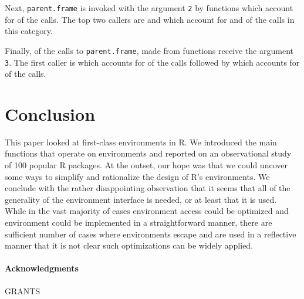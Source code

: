 \documentclass[10pt,review,sigplan,authorversion=true]{acmart}
\renewcommand{\c}[1]{\lstinline |#1|\xspace}
\begin{document}
Next, \c{parent.frame} is invoked with the argument \c{2} by
\ParentFrameDepthTwoFunCnt functions which account for
\ParentFrameDepthTwoCallPerc of the calls. The top two callers are
\ParentFrameDepthTwoCallerOneCallerName and
\ParentFrameDepthTwoCallerTwoCallerName which account for
\ParentFrameDepthTwoCallerOneCallPerc and \ParentFrameDepthTwoCallerTwoCallPerc
of the calls in this category.

Finally, \ParentFrameDepthThreeCallPerc of the calls to \c{parent.frame}, made
from \ParentFrameDepthThreeFunCnt functions receive the argument \c{3}. The
first caller is \ParentFrameDepthThreeCallerOneCallerName which accounts for
\ParentFrameDepthThreeCallerOneCallPerc of the calls followed by
\ParentFrameDepthThreeCallerTwoCallerName which accounts for
\ParentFrameDepthThreeCallerTwoCallPerc of the calls.


\section{Conclusion}

This paper looked at first-class environments in R. We introduced the main
functions that operate on environments and reported on an observational study of
100 popular R packages. At the outset, our hope was that we could uncover some
ways to simplify and rationalize the design of R's environments. We conclude
with the rather disappointing observation that it seems that all of the
generality of the environment interface is needed, or at least that it is used.
While in the vast majority of cases environment access could be optimized and
environment could be implemented in a straightforward manner, there are
sufficient number of cases where environments escape and are used in a
reflective manner that it is not clear such optimizations can be widely applied.


\paragraph{Acknowledgments} GRANTS


\end{document}
